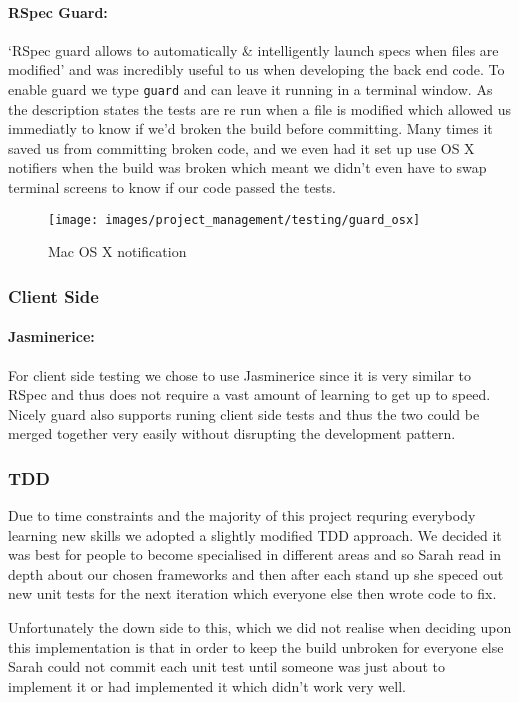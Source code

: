     \paragraph{RSpec Guard:}
      `RSpec guard allows to automatically \& intelligently launch specs when files are modified'\cite{guard} and was incredibly useful to us when developing the back end code. To enable guard we type \verb!guard! and can leave it running in a terminal window. As the description states the tests are re run when a file is modified which allowed us immediatly to know if we'd broken the build before committing.
      Many times it saved us from committing broken code, and we even had it set up use OS X notifiers when the build was broken which meant we didn't even have to swap terminal screens to know if our code passed the tests.

      \begin{figure}[H]\centering
      \texttt{[image: images/project\_management/testing/guard\_osx]}
      \caption{Mac OS X notification}
      \end{figure}

  \subsubsection{Client Side}
    \paragraph{Jasminerice:}
      For client side testing we chose to use Jasminerice since it is very similar to RSpec and thus does not require a vast amount of learning to get up to speed. Nicely guard also supports runing client side tests and thus the two could be merged together very easily without disrupting the development pattern.

  \subsubsection{TDD}
    Due to time constraints and the majority of this project requring everybody learning new skills we adopted a slightly modified TDD approach. We decided it was best for people to become specialised in different areas and so Sarah read in depth about our chosen frameworks and then after each stand up she speced out new unit tests for the next iteration which everyone else then wrote code to fix.

    Unfortunately the down side to this, which we did not realise when deciding upon this implementation is that in order to keep the build unbroken for everyone else Sarah could not commit each unit test until someone was just about to implement it or had implemented it which didn't work very well.

